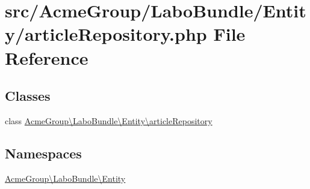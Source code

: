 \hypertarget{article_repository_8php}{\section{src/\+Acme\+Group/\+Labo\+Bundle/\+Entity/article\+Repository.php File Reference}
\label{article_repository_8php}
}
\subsection*{Classes}
\begin{DoxyCompactItemize}
\item 
class \hyperlink{class_acme_group_1_1_labo_bundle_1_1_entity_1_1article_repository}{Acme\+Group\textbackslash{}\+Labo\+Bundle\textbackslash{}\+Entity\textbackslash{}article\+Repository}
\end{DoxyCompactItemize}
\subsection*{Namespaces}
\begin{DoxyCompactItemize}
\item 
 \hyperlink{namespace_acme_group_1_1_labo_bundle_1_1_entity}{Acme\+Group\textbackslash{}\+Labo\+Bundle\textbackslash{}\+Entity}
\end{DoxyCompactItemize}
